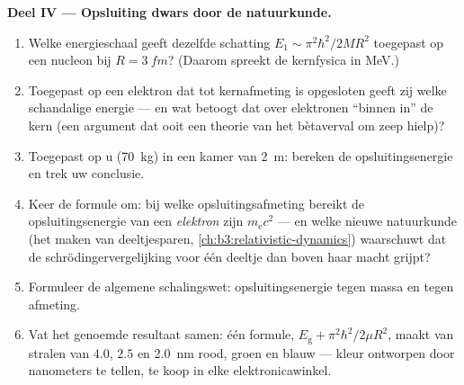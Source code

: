 \begin{problem}
\medskip\noindent\textbf{Deel IV --- Opsluiting dwars door de natuurkunde.}
\begin{enumerate}[resume]
  \item Welke energieschaal geeft dezelfde schatting $E_1 \sim \pi^2\hbar^2/2MR^2$ toegepast op een nucleon bij $R = \qty{3}{fm}$? (Daarom spreekt de kernfysica in MeV.)
  \item Toegepast op een elektron dat tot kernafmeting is opgesloten
        geeft zij welke schandalige energie --- en wat betoogt dat over
        elektronen ``binnen in'' de kern (een argument dat ooit een
        theorie van het bètaverval om zeep hielp)?
  \item Toegepast op u (\qty{70}{kg}) in een kamer van \qty{2}{m}:
        bereken de opsluitingsenergie en trek uw conclusie.
  \item Keer de formule om: bij welke opsluitingsafmeting bereikt de
        opsluitingsenergie van een \emph{elektron} zijn 
        $m_{\text{e}}c^2$ --- en welke nieuwe natuurkunde (het maken van
        deeltjesparen, \cref{ch:b3:relativistic-dynamics}) waarschuwt
        dat de schrödingervergelijking voor één deeltje dan boven haar
        macht grijpt?
  \item Formuleer de algemene schalingswet: opsluitingsenergie tegen
        massa en tegen afmeting.
  \item Vat het genoemde resultaat samen: één formule,
        $E_{\text{g}} + \pi^2\hbar^2/2\mu R^2$, maakt van stralen van
        $4.0$, $2.5$ en \qty{2.0}{nm} rood, groen en blauw --- kleur
        ontworpen door nanometers te tellen, te koop in elke
        elektronicawinkel.
\end{enumerate}
\end{problem}
